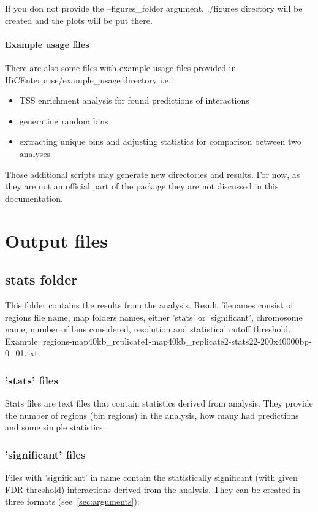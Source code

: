 If you don not provide the --figures\_folder argument, ./figures directory will be created and the plots will be put
there.

\paragraph{Example usage files}

There are also some files with example usage files provided in HiCEnterprise/example\_usage directory i.e.:
\begin{itemize}
    \item TSS enrichment analysis for found predictions of interactions
    \item generating random bins
    \item extracting unique bins and adjusting statistics for comparison between two analyses
\end{itemize}

Those additional scripts may generate new directories and results. For now, as they are not an official part of the
package they are not discussed in this documentation.

\section{Output files}

\subsection{stats folder}
This folder contains the results from the analysis. Result filenames consist of regions file name, map folders names,
either 'stats' or 'significant', chromosome name, number of bins considered, resolution and statistical cutoff
threshold. Example: regions-map40kb\_replicate1-map40kb\_replicate2-stats22-200x40000bp-0\_01.txt.

\subsubsection{'stats' files}
Stats files are text files that contain statistics derived from analysis. They provide the number of regions (bin
regions) in the analysis, how many had predictions and some simple statistics.

\subsubsection{'significant' files}
Files with 'significant' in name contain the statistically significant (with given FDR threshold) interactions derived
from the analysis. They can be created in three formats (see~\ref{sec:arguments}):
